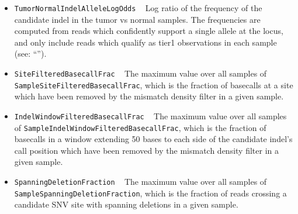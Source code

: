 \documentclass{article}
\begin{document}
\begin{itemize}
    \item \texttt{TumorNormalIndelAlleleLogOdds} ~ Log ratio of the frequency of the candidate indel in the tumor vs normal samples. The frequencies are computed from reads which confidently support a single allele at the locus, and only include reads which qualify as tier1 observations in each sample (see: ``'').

    \item \texttt{SiteFilteredBasecallFrac} ~ The maximum value over all samples of \texttt{SampleSiteFilteredBasecallFrac}, which is the fraction of basecalls at a site which have been removed by the mismatch density filter in a given sample.

    \item \texttt{IndelWindowFilteredBasecallFrac} ~ The maximum value over all samples of \texttt{SampleIndelWindowFilteredBasecallFrac}, which is the fraction of basecalls in a window extending 50 bases to each side of the candidate indel's call position which have been removed by the mismatch density filter in a given sample.

    \item \texttt{SpanningDeletionFraction} ~ The maximum value over all samples of \texttt{SampleSpanningDeletionFraction}, which is the fraction of reads crossing a candidate SNV site with spanning deletions in a given sample.
\end{itemize}



\end{document}
